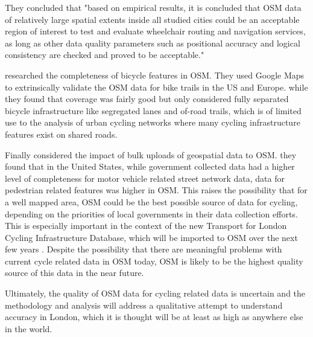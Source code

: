 They concluded that "based on empirical results, it is concluded that OSM data of relatively large spatial extents inside all studied cities could be an acceptable region of interest to test and evaluate wheelchair routing and navigation services, as long as other data quality parameters such as positional accuracy and logical consistency are checked and proved to be acceptable."  

\cite{hochmair2013assessing} researched the completeness of bicycle features in OSM. They used Google Maps to extrinsically validate the OSM data for bike trails in the US and Europe. while they found that coverage was fairly good but only considered fully separated bicycle infrastructure like segregated lanes and of-road trails, which is of limited use to the analysis of urban cycling networks where many cycling infrastructure features exist on shared roads. 

Finally \cite{zielstra2013assessing} considered the impact of bulk uploads of geospatial data to OSM. they found that in the United States, while government collected data had a higher level of completeness for motor vehicle related street network data, data for pedestrian related features was higher in OSM. This raises the possibility that for a well mapped area, OSM could be the best possible source of data for cycling, depending on the priorities of local governments in their data collection efforts. This is especially important in the context of the new Transport for London Cycling Infrastructure Database, which will be imported to OSM over the next few years \cite{tflcid}. Despite the possibility that there are meaningful problems with current cycle related data in OSM today, OSM is likely to be the highest quality source of this data in the near future. 

Ultimately, the quality of OSM data for cycling related data is uncertain and the methodology and analysis will address a qualitative attempt to understand accuracy in London, which it is thought will be at least as high as anywhere else in the world. 
